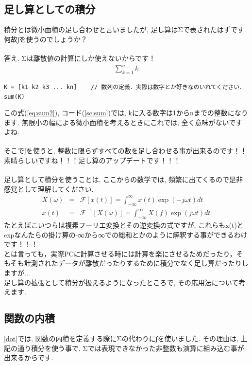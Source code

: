 \documentclass[11pt,a4paper,uplatex]{ujreport}
\begin{document}
\subsection{足し算としての積分}
積分とは微小面積の足し合わせと言いましたが, 足し算はΣで表されたはずです. 何故∫を使うのでしょうか？\\
\\
答え. Σは離散値の計算にしか使えないからです！\\



\begin{eqnarray}
\label{eq:sum2}
\sum_{k=1}^{n} k
\end{eqnarray}

\begin{lstlisting}[caption=\ref{eq:sum2}のコード,label=sc:sum,  keepspaces=true]
K = [k1 k2 k3 ... kn]    // 数列の定義．実際は数字とか好きなのいれてください．
sum(K)
\end{lstlisting}


この式(\ref{eq:sum2}), コード(\ref{sc:sum})では, kに入る数字は1からnまでの整数になります. 無限小の幅による微小面積を考えるときにこれでは, 全く意味がないですよね.\\
\\
そこで∫を使うと, 整数に限らずすべての数を足し合わせる事が出来るのです！！\\
素晴らしいですね！！！足し算のアップデートです！！！\\
\\
足し算として積分を使うことは, ここからの数学では, 頻繁に出てくるので是非感覚として理解してください.
\begin{eqnarray}
\label{eq:int3}
X(\omega) &=& \mathcal{F}[x(t)] = \int^{\infty}_{-\infty}x(t)\exp(-j \omega t)dt \\
 x(t) &=& \mathcal{F}^{-1}[X(\omega)] = \int^{\infty}_{-\infty}X(f)\exp(j \omega t)dt 
\end{eqnarray}
たとえばこいつらは複素フーリエ変換とその逆変換の式ですが, これらもx(t)とexpなんたらの掛け算の-∞から∞での総和とかのように解釈する事ができるわけです！！！\\
とは言っても，実際PCに計算させる時には計算を楽にさせるためだったり，そもそも計測されたデータが離散だったりするために積分でなく足し算だったりしますが...\\

足し算の拡張として積分が扱えるようになったところで, その応用法について考えます. 
\subsection{関数の内積 \label{dot_func}}
\ref{dot}では, 関数の内積を定義する際にΣの代わりに∫を使いました. その理由は, 上記の通り積分を使う事で, Σでは表現できなかった非整数も演算に組み込む事が出来るからです.\\
\\
\end{document}
